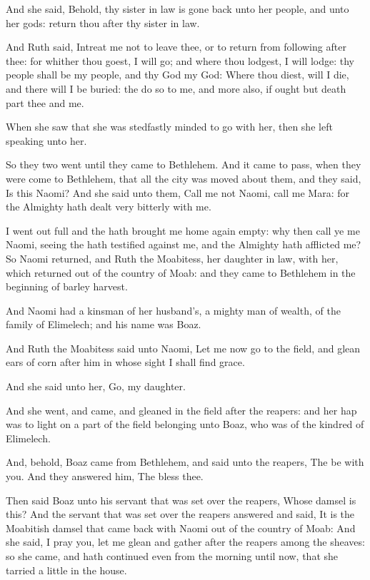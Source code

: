 \Verse And she said, Behold, thy sister in law is gone back unto her people, and unto her gods: return thou after thy sister in law.

\Verse And Ruth said, Intreat me not to leave thee, or to return from following after thee: for whither thou goest, I will go; and where thou lodgest, I will lodge: thy people shall be my people, and thy God my God: \Verse Where thou diest, will I die, and there will I be buried: the \LORD do so to me, and more also, if ought but death part thee and me.

\Verse When she saw that she was stedfastly minded to go with her, then she left speaking unto her.

\Verse So they two went until they came to Bethlehem. And it came to pass, when they were come to Bethlehem, that all the city was moved about them, and they said, Is this Naomi?  \Verse And she said unto them, Call me not Naomi, call me Mara: for the Almighty hath dealt very bitterly with me.

\Verse I went out full and the \LORD hath brought me home again empty: why then call ye me Naomi, seeing the \LORD hath testified against me, and the Almighty hath afflicted me?  \Verse So Naomi returned, and Ruth the Moabitess, her daughter in law, with her, which returned out of the country of Moab: and they came to Bethlehem in the beginning of barley harvest.


\Chapter
\Verse And Naomi had a kinsman of her husband's, a mighty man of wealth, of the family of Elimelech; and his name was Boaz.

\Verse And Ruth the Moabitess said unto Naomi, Let me now go to the field, and glean ears of corn after him in whose sight I shall find grace.

And she said unto her, Go, my daughter.

\Verse And she went, and came, and gleaned in the field after the reapers: and her hap was to light on a part of the field belonging unto Boaz, who was of the kindred of Elimelech.

\Verse And, behold, Boaz came from Bethlehem, and said unto the reapers, The \LORD be with you. And they answered him, The \LORD bless thee.

\Verse Then said Boaz unto his servant that was set over the reapers, Whose damsel is this?  \Verse And the servant that was set over the reapers answered and said, It is the Moabitish damsel that came back with Naomi out of the country of Moab: \Verse And she said, I pray you, let me glean and gather after the reapers among the sheaves: so she came, and hath continued even from the morning until now, that she tarried a little in the house.

